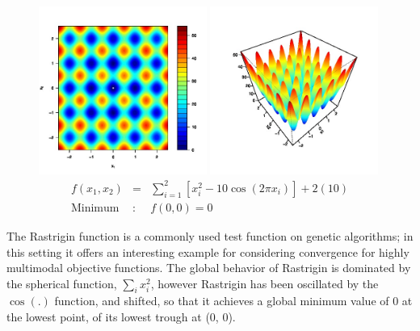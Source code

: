 \documentclass[12pt]{article}
\begin{document}
	\begin{figure}[!h]
	\centering
	\includegraphics[width=0.49\textwidth]{./figures/rastContour.jpg}
	\includegraphics[width=0.49\textwidth]{./figures/rastPersp.jpg}
	\vspace{-0.5cm}
	\begin{eqnarray}
	f(x_1, x_2) &=& \sum_{i=1}^2\left[x_i^2-10\cos(2\pi x_i)\right] + 2(10)\\
	\label{rastEq}
	\text{Minimum}&:& f(0, 0)=0\nonumber
	\end{eqnarray}
	\end{figure}
	
	\vspace{-0.5cm}
	The Rastrigin function \cite{rastCite} is a commonly used test function on genetic algorithms; in this setting it offers an interesting example for considering convergence for highly multimodal objective functions.
	The global behavior of Rastrigin is dominated by the spherical function, $\sum_i x_i^2$, however Rastrigin has been oscillated by the $\cos(.)$ function, and shifted, so that it achieves a global minimum value of 0 at the lowest point, of its lowest trough at (0, 0).
	
\end{document}
